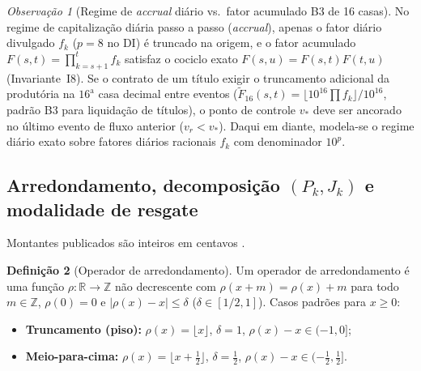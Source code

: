 \documentclass[11pt, a4paper]{article}
\theoremstyle{definition}
\newtheorem{definicao}{Definição}[section]
\theoremstyle{plain}
\theoremstyle{remark}
\newtheorem{observacao}[definicao]{Observação}
\begin{document}
\begin{observacao}[Regime de \emph{accrual} diário vs.\ fator acumulado B3 de 16 casas]\label{obs:5.2}
No regime de capitalização diária passo a passo (\emph{accrual}), apenas o fator diário divulgado $f_k$ ($p=8$ no DI) é truncado na origem, e o fator acumulado $F(s,t) = \prod_{k=s+1}^t f_k$ satisfaz o cociclo exato $F(s,u) = F(s,t)F(t,u)$ (Invariante~I8). Se o contrato de um título exigir o truncamento adicional da produtória na $16^{\text{a}}$ casa decimal entre eventos ($\tilde{F}_{16}(s,t) = \lfloor 10^{16}\prod f_k\rfloor/10^{16}$, padrão B3 para liquidação de títulos), o ponto de controle $v_*$ deve ser ancorado no último evento de fluxo anterior ($v_r < v_*$). Daqui em diante, modela-se o regime diário exato sobre fatores diários racionais $f_k$ com denominador $10^p$.
\end{observacao}

\subsection{Arredondamento, decomposição $(P_k, J_k)$ e modalidade de resgate}\label{sec:5.2}

Montantes publicados são inteiros em centavos \cite{Higham2002}.

\begin{definicao}[Operador de arredondamento]\label{def:5.3}
Um operador de arredondamento é uma função $\rho : \mathbb{R} \to \mathbb{Z}$ não decrescente com $\rho(x + m) = \rho(x) + m$ para todo $m \in \mathbb{Z}$, $\rho(0) = 0$ e $|\rho(x) - x| \le \delta$ ($\delta \in [1/2, 1]$). Casos padrões para $x \ge 0$:
\begin{itemize}
    \item \textbf{Truncamento (piso):} $\rho(x) = \lfloor x \rfloor$, $\delta = 1$, $\rho(x) - x \in (-1, 0]$;
    \item \textbf{Meio-para-cima:} $\rho(x) = \lfloor x + \frac{1}{2} \rfloor$, $\delta = \frac{1}{2}$, $\rho(x) - x \in (-\frac{1}{2}, \frac{1}{2}]$.
\end{itemize}
\end{definicao}
\end{document}
